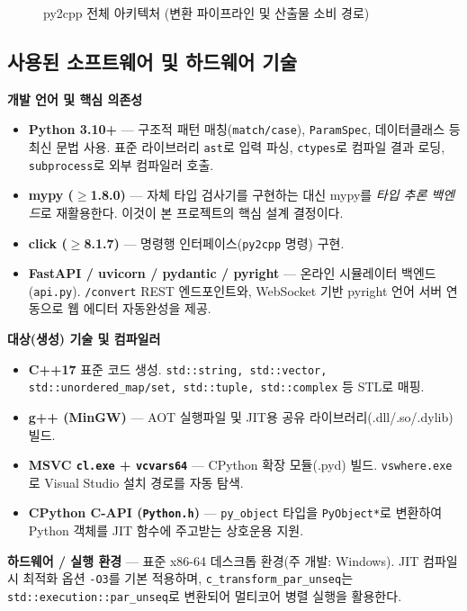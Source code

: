 \documentclass[10pt]{article}
\begin{document}
\begin{figure}[h]
\caption{py2cpp 전체 아키텍처 (변환 파이프라인 및 산출물 소비 경로)}
\label{fig:arch}
\end{figure}

\subsection{사용된 소프트웨어 및 하드웨어 기술}
\textbf{개발 언어 및 핵심 의존성}
\begin{itemize}
  \item \textbf{Python 3.10+} — 구조적 패턴 매칭(\texttt{match/case}), \texttt{ParamSpec}, 데이터클래스 등 최신 문법 사용. 표준 라이브러리 \texttt{ast}로 입력 파싱, \texttt{ctypes}로 컴파일 결과 로딩, \texttt{subprocess}로 외부 컴파일러 호출.
  \item \textbf{mypy ($\ge$1.8.0)} — 자체 타입 검사기를 구현하는 대신 mypy를 \emph{타입 추론 백엔드}로 재활용한다. 이것이 본 프로젝트의 핵심 설계 결정이다.
  \item \textbf{click ($\ge$8.1.7)} — 명령행 인터페이스(\texttt{py2cpp} 명령) 구현.
  \item \textbf{FastAPI / uvicorn / pydantic / pyright} — 온라인 시뮬레이터 백엔드(\texttt{api.py}). \texttt{/convert} REST 엔드포인트와, WebSocket 기반 pyright 언어 서버 연동으로 웹 에디터 자동완성을 제공.
\end{itemize}

\textbf{대상(생성) 기술 및 컴파일러}
\begin{itemize}
  \item \textbf{C++17} 표준 코드 생성. \texttt{std::string, std::vector, std::unordered\_map/set, std::tuple, std::complex} 등 STL로 매핑.
  \item \textbf{g++ (MinGW)} — AOT 실행파일 및 JIT용 공유 라이브러리(.dll/.so/.dylib) 빌드.
  \item \textbf{MSVC \texttt{cl.exe} + \texttt{vcvars64}} — CPython 확장 모듈(.pyd) 빌드. \texttt{vswhere.exe}로 Visual Studio 설치 경로를 자동 탐색.
  \item \textbf{CPython C-API (\texttt{Python.h})} — \texttt{py\_object} 타입을 \texttt{PyObject*}로 변환하여 Python 객체를 JIT 함수에 주고받는 상호운용 지원.
\end{itemize}

\textbf{하드웨어 / 실행 환경} — 표준 x86-64 데스크톱 환경(주 개발: Windows). JIT 컴파일 시 최적화 옵션 \texttt{-O3}를 기본 적용하며, \texttt{c\_transform\_par\_unseq}는 \texttt{std::execution::par\_unseq}로 변환되어 멀티코어 병렬 실행을 활용한다.
\end{document}
